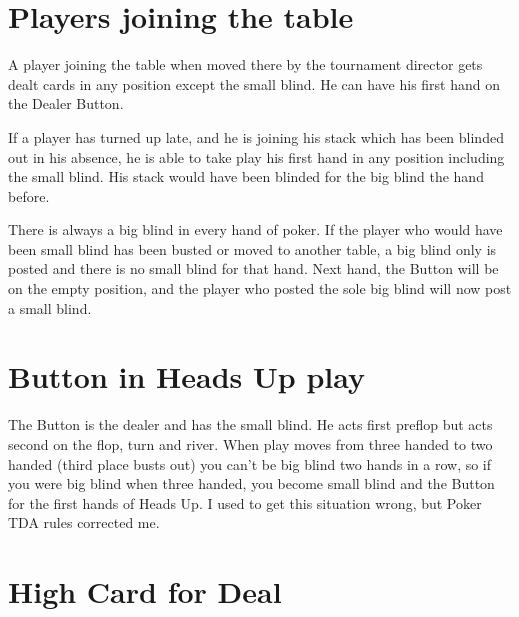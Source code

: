 

\section{Players joining the table}

A player joining the table when moved there by the tournament director
gets dealt cards in any position except the small blind. 
He can have his first hand on the Dealer Button.

If a player has turned up late, and he is joining his stack which has been
blinded out in his absence, he is able to take play his first hand in
any position including the small blind. His stack would have been blinded 
for the big blind the hand before.

There is always a big blind in every hand of poker. If the player who
would have been small blind has been busted or moved to another table,
a big blind only is posted and there is no small blind for that hand.
Next hand, the Button will be on the empty position, and the player
who posted the sole big blind will now post a small blind.

\section{Button in Heads Up play}

The Button is the dealer and has the small blind. He acts first preflop
but acts second on the flop, turn and river. When play moves from
three handed to two handed (third place busts out) you can't be big blind
two hands in a row, so if you were big blind when three handed, you become
small blind and the Button for the first hands of Heads Up. I used to
get this situation wrong, but Poker TDA rules corrected me.

\section{High Card for Deal}

